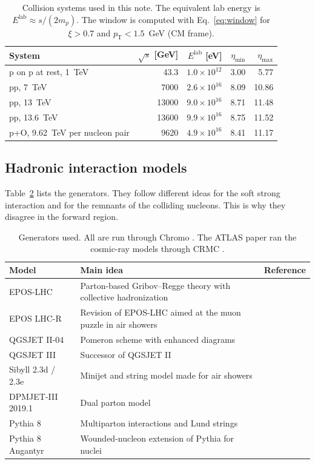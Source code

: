 \documentclass[11pt,a4paper]{article}
\newcommand{\pT}{\ensuremath{p_{\mathrm{T}}}}
\begin{document}
\begin{table}[!htbp]
\centering
\small
\caption{Collision systems used in this note. The equivalent lab energy is $E^{\mathrm{lab}}\approx s/(2m_p)$. The window is computed with Eq.~\eqref{eq:window} for $\xi>0.7$ and $\pT<1.5$~GeV (CM frame).}
\label{tab:systems}
\begin{tabular}{@{}lrrrr@{}}
\toprule
System & $\sqrt{s}$ [GeV] & $E^{\mathrm{lab}}$ [eV] & $\eta_{\min}$ & $\eta_{\max}$\\
\midrule
p on p at rest, 1~TeV & 43.3 & $1.0\times10^{12}$ & 3.00 & 5.77\\
pp, 7~TeV & 7000 & $2.6\times10^{16}$ & 8.09 & 10.86\\
pp, 13~TeV & 13000 & $9.0\times10^{16}$ & 8.71 & 11.48\\
pp, 13.6~TeV & 13600 & $9.9\times10^{16}$ & 8.75 & 11.52\\
p+O, 9.62~TeV per nucleon pair & 9620 & $4.9\times10^{16}$ & 8.41 & 11.17\\
\bottomrule
\end{tabular}
\end{table}

\subsection{Hadronic interaction models}
Table~\ref{tab:models} lists the generators.
They follow different ideas for the soft strong interaction and for the remnants of the colliding nucleons.
This is why they disagree in the forward region.

\begin{table}[!htbp]
\centering
\small
\caption{Generators used. All are run through Chromo \cite{Fedynitch:2025chromo}. The ATLAS paper ran the cosmic-ray models through CRMC \cite{Ulrich:2021crmc}.}
\label{tab:models}
\begin{tabular}{@{}p{3.1cm}p{6.4cm}p{3.6cm}@{}}
\toprule
Model & Main idea & Reference\\
\midrule
EPOS-LHC & Parton-based Gribov--Regge theory with collective hadronization & \cite{Pierog:2015epos}\\
EPOS LHC-R & Revision of EPOS-LHC aimed at the muon puzzle in air showers & \cite{Pierog:2025eposr}\\
QGSJET II-04 & Pomeron scheme with enhanced diagrams & \cite{Ostapchenko:2011qgsjet}\\
QGSJET III & Successor of QGSJET II & \cite{Ostapchenko:2024qgsjet3f,Ostapchenko:2024qgsjet3}\\
Sibyll 2.3d / 2.3e & Minijet and string model made for air showers & \cite{Riehn:2020sibyll}\\
DPMJET-III 2019.1 & Dual parton model & \cite{Roesler:2000dpmjet,Bopp:2008dpmjet,Fedynitch:2015thesis}\\
Pythia 8 & Multiparton interactions and Lund strings & \cite{Bierlich:2022pythia}\\
Pythia 8 Angantyr & Wounded-nucleon extension of Pythia for nuclei & \cite{Bierlich:2018angantyr}\\
\bottomrule
\end{tabular}
\end{table}
\end{document}
